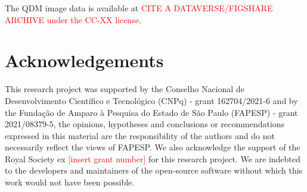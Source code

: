 The QDM image data is available at \textcolor{red}{CITE A DATAVERSE/FIGSHARE ARCHIVE under the CC-XX license}.


\section{Acknowledgements}
This research project was supported by the Conselho Nacional de Desenvolvimento Científico e Tecnológico (CNPq) - grant 162704/2021-6 and by the Fundação de Amparo à Pesquisa do Estado de São Paulo (FAPESP) - grant 2021/08379-5, the opinions, hypotheses and conclusions or recommendations expressed in this material are the responsibility of the authors and do not necessarily reflect the views of FAPESP. We also acknowledge the support of the Royal Society ex \textcolor{red}{[insert grant number]} for this research project. We are indebted to the developers and maintainers of the open-source software without which this work would not have been possible.
